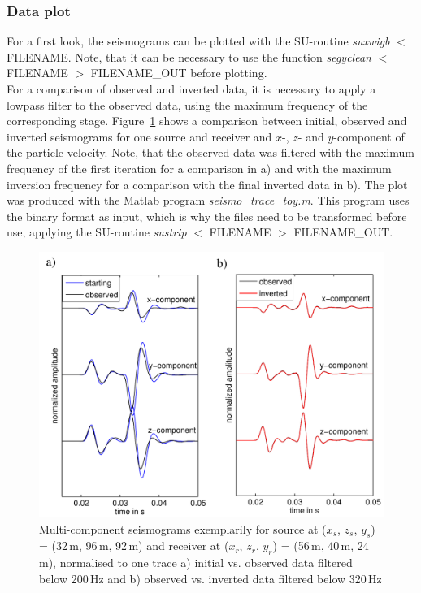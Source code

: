 \subsubsection*{Data plot}
For a first look, the seismograms can be plotted with the SU-routine \textit{suxwigb} $<$ FILENAME. Note, that it can be necessary to use the function \textit{segyclean} $<$ FILENAME $>$ FILENAME\_OUT before plotting.\\
For a comparison of observed and inverted data, it is necessary to apply a lowpass filter to the observed data, using the maximum frequency of the corresponding stage. Figure~\ref{fig:toy_seismo1} shows a comparison between initial, observed and inverted seismograms for one source and receiver and $x$-, $z$- and $y$-component of the particle velocity. Note, that the observed data was filtered with the maximum frequency of the first iteration for a comparison in a) and with the maximum inversion frequency for a comparison with the final inverted data in b). The plot was produced with the Matlab program \textit{seismo\_trace\_toy.m}. This program uses the binary format as input, which is why the files need to be transformed before use, applying the SU-routine \textit{sustrip} $<$ FILENAME $>$ FILENAME\_OUT.
\begin{figure}[h!]
\begin{center}
\includegraphics[width=\textwidth]{fig_toy/seismo1_toy}
\caption[Toy example - observed, initial and inverted seismograms]{Multi-component seismograms exemplarily for source at ($x_s$, $z_s$, $y_s$) = (32\,m, 96\,m, 92\,m) and receiver at ($x_r$, $z_r$, $y_r$) = (56\,m, 40\,m, 24\,m), normalised to one trace a) initial vs. observed data filtered below 200\,Hz and b) observed vs. inverted data filtered below 320\,Hz} \label{fig:toy_seismo1}
\end{center}
\end{figure}
